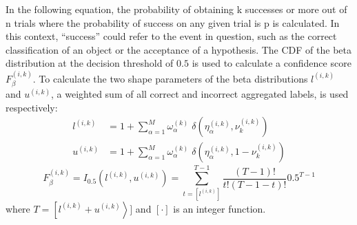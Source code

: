 In the following equation, the probability of obtaining k successes or more out of n trials where the probability of success on any given trial is p is calculated. In this context, ``success'' could refer to the event in question, such as the correct classification of an object or the acceptance of a hypothesis. The CDF of the beta distribution at the decision threshold of $0.5 $ is used to calculate a confidence score $F_{\beta}^{(i,k)}$. To calculate the two shape parameters of the beta distributions $l^{(i,k)}$ and $u^{(i,k)}$, a weighted sum of all correct and incorrect aggregated labels, is used respectively:
\begin{equation}
    \begin{aligned}
        l^{(i,k)} &= 1 + \sum_{\alpha=1}^{M} \omega_{\alpha}^{(k)} \; \delta\left(\eta_{\alpha}^{(i,k)}, \nu_{k}^{(i,k)}\right) \\
        u^{(i,k)} &= 1 + \sum_{\alpha=1}^{M} \omega_{\alpha}^{(k)} \; \delta\left(\eta_{\alpha}^{(i,k)}, 1 - \nu_{k}^{(i,k)}\right)
    \end{aligned}
    \label{eq:crowd.Eq.14.beta_l_u}
\end{equation}
%
\begin{equation}
    F_{\beta}^{(i,k)} =I_{0.5}\left(l^{(i,k)},u^{(i,k)}\right)=\sum_{t=[l^{(i,k)}]}^{T-1}\frac{(T-1)!}{t!(T-1-t)!}0.5^{T-1}
    \label{eq:crowd.Eq.15.confidence-score.beta}
\end{equation}
where $T = \left [ l^{(i,k)} + u^{(i,k)} \right >] $ and $\left [ \cdot \right ] $ is an integer function.


